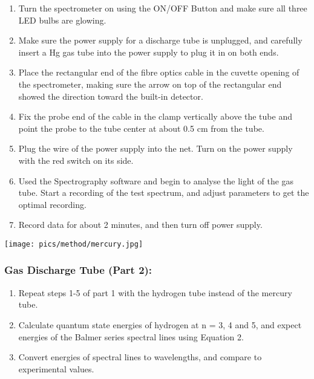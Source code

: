 \documentclass[10pt, letterpaper, twoside]{article}
\newenvironment{Figure}
  {\par\medskip\noindent\minipage{\linewidth}}
  {\endminipage\par\medskip}
\begin{document}
\begin{enumerate}
    \item Turn the spectrometer on using the ON/OFF Button and make sure all three LED bulbs are glowing.
    \item Make sure the power supply for a discharge tube is unplugged, and carefully insert a Hg gas tube into the power supply to plug it in on both ends.
    \item Place the rectangular end of the fibre optics cable in the cuvette opening of the spectrometer, making sure the arrow on top of the rectangular end showed the direction toward the built-in detector.
    \item Fix the probe end of the cable in the clamp vertically above the tube and point the probe to the tube center at about 0.5 cm from the tube.
    \item Plug the wire of the power supply into the net. Turn on the power supply with the red switch on its side.
    \item Used the Spectrography software and begin to analyse the light of the gas tube. Start a recording of the test spectrum, and adjust parameters to get the optimal recording. 
    \item Record data for about 2 minutes, and then turn off power supply.
\end{enumerate}

\begin{Figure}
    \begin{center}
        \texttt{[image: pics/method/mercury.jpg]}
    \end{center}
\end{Figure}

\subsubsection{Gas Discharge Tube (Part 2):}

\begin{enumerate}
    \item Repeat steps 1-5 of part 1 with the hydrogen tube instead of the mercury tube.
    \item Calculate quantum state energies of hydrogen at n = 3, 4 and 5, and expect energies of the Balmer series spectral lines using Equation 2.
    \item Convert energies of spectral lines to wavelengths, and compare to experimental values.
\end{enumerate}
\end{document}
